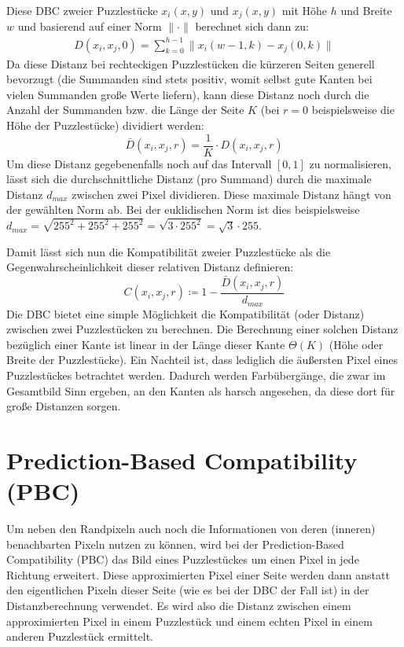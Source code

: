 \documentclass{whswinvcbook}
\begin{document}
Diese DBC zweier Puzzlestücke $x_i(x,y)$ und $x_j(x,y)$ mit Höhe $h$ und Breite $w$ und basierend auf einer Norm $\|\cdot\|$ berechnet sich dann zu:
\begin{align} \label{eq-dbc}
    D(x_i,x_j,0)=\sum_{k=0}^{h-1}\|x_i(w-1,k)-x_j(0,k)\|
\end{align}
Da diese Distanz bei rechteckigen Puzzlestücken die kürzeren Seiten generell bevorzugt (die Summanden sind stets positiv, womit selbst gute Kanten bei vielen Summanden große Werte liefern), kann diese Distanz noch durch die Anzahl der Summanden bzw. die Länge der Seite $K$ (bei $r=0$ beispielsweise die Höhe der Puzzlestücke) dividiert werden: $$\bar{D}(x_i,x_j,r)=\frac{1}{K}\cdot D(x_i,x_j,r)$$
Um diese Distanz gegebenenfalls noch auf das Intervall $[0,1]$ zu normalisieren, lässt sich die durchschnittliche Distanz (pro Summand) durch die maximale Distanz $d_{max}$ zwischen zwei Pixel dividieren. Diese maximale Distanz hängt von der gewählten Norm ab. Bei der euklidischen Norm ist dies beispielsweise $d_{max}=\sqrt{255^2+255^2+255^2}=\sqrt{3\cdot255^2}=\sqrt{3}\cdot255$.

Damit lässt sich nun die Kompatibilität zweier Puzzlestücke als die Gegenwahrscheinlichkeit dieser relativen Distanz definieren:$$C(x_i,x_j,r)\coloneqq 1-\frac{\bar{D}(x_i,x_j,r)}{d_{max}}$$
Die DBC bietet eine simple Möglichkeit die Kompatibilität (oder Distanz) zwischen zwei Puzzlestücken zu berechnen. Die Berechnung einer solchen Distanz bezüglich einer Kante ist linear in der Länge dieser Kante $\Theta(K)$ (Höhe oder Breite der Puzzlestücke). Ein Nachteil ist, dass lediglich die äußersten Pixel eines Puzzlestückes betrachtet werden. Dadurch werden Farbübergänge, die zwar im Gesamtbild Sinn ergeben, an den Kanten als harsch angesehen, da diese dort für große Distanzen sorgen.
\section{Prediction-Based Compatibility (PBC)}\label{section-pbc}
Um neben den Randpixeln auch noch die Informationen von deren (inneren) benachbarten Pixeln nutzen zu können, wird bei der Prediction-Based Compatibility (PBC) das Bild eines Puzzlestückes um einen Pixel in jede Richtung erweitert. Diese approximierten Pixel einer Seite werden dann anstatt den eigentlichen Pixeln dieser Seite (wie es bei der DBC der Fall ist) in der Distanzberechnung verwendet. Es wird also die Distanz zwischen einem approximierten Pixel in einem Puzzlestück und einem echten Pixel in einem anderen Puzzlestück ermittelt.
\end{document}
